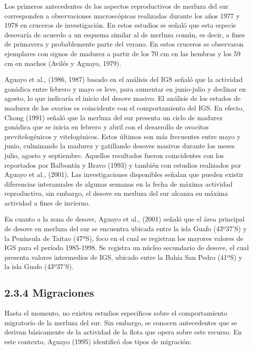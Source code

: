 \documentclass[
  spanish,
]{article}
\begin{document}
Los primeros antecedentes de los aspectos reproductivos de merluza del
sur corresponden a observaciones macroscópicas realizadas durante los
años 1977 y 1978 en cruceros de investigación. En estos estudios se
señaló que esta especie desovaría de acuerdo a un esquema similar al de
merluza común, es decir, a fines de primavera y probablemente parte del
verano. En estos cruceros se observaron ejemplares con signos de madurez
a partir de los 70 cm en las hembras y los 59 cm en machos (Avilés y
Aguayo, 1979).

Aguayo et al., (1986, 1987) basado en el análisis del IGS señaló que la
actividad gonádica entre febrero y mayo es leve, para aumentar en
junio-julio y declinar en agosto, lo que indicaría el inicio del desove
masivo. El análisis de los estados de madurez de los ovarios es
coincidente con el comportamiento del IGS. En efecto, Chong (1991)
señaló que la merluza del sur presenta un ciclo de madurez gonádica que
se inicia en febrero y abril con el desarrollo de ovocitos
previtelogénicos y vitelogénicos. Estos últimos son más frecuentes entre
mayo y junio, culminando la madurez y gatillando desoves masivos durante
los meses julio, agosto y septiembre. Aquellos resultados fueron
coincidentes con los reportados por Balbontín y Bravo (1993) y también
con estudios realizados por Aguayo et al., (2001). Las investigaciones
disponibles señalan que pueden existir diferencias interanuales de
algunas semanas en la fecha de máxima actividad reproductiva, sin
embargo, el desove en merluza del sur alcanza su máxima actividad a
fines de invierno.

En cuanto a la zona de desove, Aguayo et al., (2001) señaló que el área
principal de desove en merluza del sur se encuentra ubicada entre la
isla Guafo (43º37'S) y la Península de Taitao (47ºS), foco en el cual se
registran los mayores valores de IGS para el período 1985-1998. Se
registra un núcleo secundario de desove, el cual presenta valores
intermedios de IGS, ubicado entre la Bahía San Pedro (41ºS) y la isla
Guafo (43º37'S).

\hypertarget{migraciones}{%
\subsection{2.3.4 Migraciones}\label{migraciones}}

Hasta el momento, no existen estudios específicos sobre el
comportamiento migratorio de la merluza del sur. Sin embargo, se conocen
antecedentes que se derivan básicamente de la actividad de la flota que
opera sobre este recurso. En este contexto, Aguayo (1995) identificó dos
tipos de migración:
\end{document}
